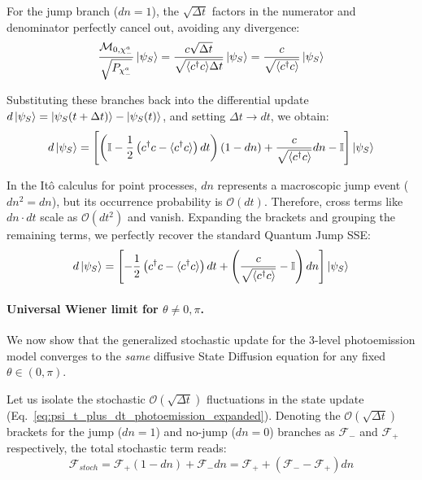 \documentclass[a4paper,12pt]{article}
\begin{document}
For the jump branch ($ dn = 1 $), the $ \sqrt{\Delta t} $ factors in the numerator and denominator perfectly cancel out, avoiding any divergence:
\begin{equation}
	\frac{\mathcal{M}_{0, \chi_{-}^{a}}}{\sqrt{P_{\chi_{-}^{a}}}} \ket{\psi_{S}} = \frac{c \sqrt{\Delta t}}{\sqrt{\langle c^\dagger c \rangle \Delta t}} \ket{\psi_{S}} = \frac{c}{\sqrt{\langle c^\dagger c \rangle}} \ket{\psi_{S}}
\end{equation}

Substituting these branches back into the differential update $ d\ket{\psi_{S}} = \ket{\psi_{S}(t+\Delta t)} - \ket{\psi_{S}(t)} $, and setting $ \Delta t \to dt $, we obtain:
\begin{equation}
	d\ket{\psi_{S}} = \left[ \left( \mathbb{I} - \frac{1}{2} \left( c^\dagger c - \langle c^\dagger c \rangle \right) dt \right) (1 - dn) + \frac{c}{\sqrt{\langle c^\dagger c \rangle}} dn - \mathbb{I} \right] \ket{\psi_{S}}
\end{equation}

In the Itô calculus for point processes, $ dn $ represents a macroscopic jump event ($ dn^2 = dn $), but its occurrence probability is $ \mathcal{O}(dt) $. Therefore, cross terms like $ dn \cdot dt $ scale as $ \mathcal{O}(dt^2) $ and vanish. Expanding the brackets and grouping the remaining terms, we perfectly recover the standard Quantum Jump SSE:
\begin{equation}
	d\ket{\psi_{S}} = \left[ -\frac{1}{2}\left(c^\dagger c - \langle c^\dagger c \rangle\right)dt + \left( \frac{c}{\sqrt{\langle c^\dagger c \rangle}} - \mathbb{I} \right)dn \right] \ket{\psi_{S}}
	\label{eq:standard_QJ_SSE}
\end{equation}

\paragraph{Universal Wiener limit for $\theta \neq 0,\pi$.}
We now show that the generalized stochastic update for the 3-level photoemission model converges to the \emph{same} diffusive State Diffusion equation for any fixed $\theta \in (0,\pi)$. 

Let us isolate the stochastic $ \mathcal{O}(\sqrt{\Delta t}) $ fluctuations in the state update (Eq.~\ref{eq:psi_t_plus_dt_photoemission_expanded}). Denoting the $ \mathcal{O}(\sqrt{\Delta t}) $ brackets for the jump ($dn=1$) and no-jump ($dn=0$) branches as $ \mathcal{F}_{-} $ and $ \mathcal{F}_{+} $ respectively, the total stochastic term reads:
\begin{equation}
	\mathcal{F}_{stoch} = \mathcal{F}_{+} (1 - dn) + \mathcal{F}_{-} dn = \mathcal{F}_{+} + (\mathcal{F}_{-} - \mathcal{F}_{+}) dn
\end{equation}
\end{document}
